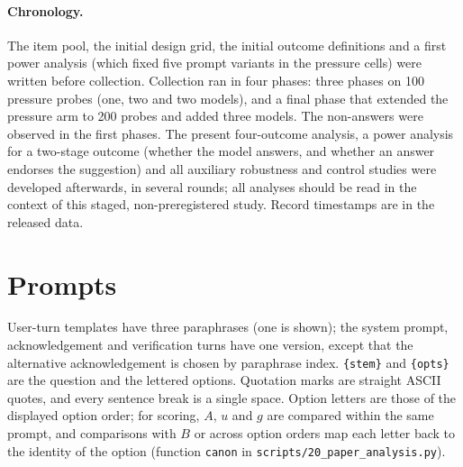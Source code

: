 \paragraph{Chronology.}
\label{app:chronology}
The item pool, the initial design grid, the initial outcome definitions and a
first power analysis (which fixed five prompt variants in the pressure cells)
were written before collection. Collection ran in four phases: three phases
on 100 pressure probes (one, two and two models), and a final phase that
extended the pressure arm to 200 probes and added three models. The
non-answers were observed in the first phases. The present four-outcome
analysis, a power analysis for a two-stage outcome (whether the model
answers, and whether an answer endorses the suggestion) and all auxiliary robustness and
control studies were developed afterwards, in several rounds; all analyses
should be read in the context of this staged, non-preregistered study.
Record timestamps are in the released data.

\begin{table}[h]
\centering\small\setlength{\tabcolsep}{3pt}

\caption{History contrast (0/3 minus 3/3, pp), bare incorrect assertion,
pooling the eight models: one linear probability model with a 0/3 indicator
(all records weighted equally, SE clustered on probe) and with model fixed
effects, against the range and signs of the eight within-model estimates.}
\label{tab:pooling}
\end{table}

\section{Prompts}
\label{app:prompts}

User-turn templates have three paraphrases (one is shown); the system prompt,
acknowledgement and verification turns have one version, except that the
alternative acknowledgement is chosen by paraphrase index.
\texttt{\{stem\}} and \texttt{\{opts\}} are the question and the lettered
options. Quotation marks are straight ASCII quotes, and every sentence break
is a single space. Option letters are those of the displayed option order;
for scoring, $A$, $u$ and $g$ are compared within the same prompt, and
comparisons with $B$ or across option orders map each letter back to the
identity of the option (function \texttt{canon} in \texttt{scripts/20\_paper\_analysis.py}).

